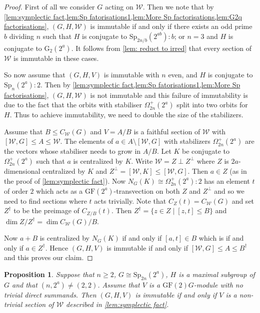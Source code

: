 \documentclass[12pt]{amsart}
\newtheorem{proposition}[theorem]{Proposition}
\theoremstyle{remark}
\theoremstyle{notation}
\theoremstyle{definition}
\newcommand{\GF}{\mathrm{GF}}
\newcommand{\Sp}{\mathrm{Sp}}
\newcommand{\0}{\emptyset}
\begin{document}
  \begin{proof}  First of all we consider $G$ acting on ${\mathcal W}$. Then we note that by \cref{lem:symplectic fact,lem:Sp fatorisations1,lem:More Sp factorisations,lem:G2q factorisations},  $(G,H,{\mathcal W})$ is immutable if and only if  there exists an odd prime $b$ dividing $n$ such that $H$ is conjugate to $\Sp_{2n/b}(2^{ab}){:}b$; or
  $n=3$ and $H$ is conjugate to  $\mathrm{G}_2(2^a)$. It follows from \cref{lem: reduct to irred}  that every section of ${\mathcal W}$ is immutable in these cases.




So now assume that $(G,H,V)$ is immutable with $n$ even, and $H$ is conjugate to $\Sp_{n}(2^a){:}2$. Then by \cref{lem:symplectic fact,lem:Sp fatorisations1,lem:More Sp factorisations}, $(G,H,{\mathcal W})$ is not immutable and this failure of immutability is due to the fact that the orbits with stabiliser $\Omega_{2n}^+(2^a)$ split into two orbits for $H$.  Thus to achieve immutability, we need to double the size of the stabilizers.

 Assume that $B \le C_{\mathcal W}(G)$ and $V=A/B$ is a faithful section of ${\mathcal W}$ with $[{\mathcal W},G]\le A \le {\mathcal W}$.  The elements of $a \in A\setminus [{\mathcal W},G]$ with stabilizers $\Omega_{2n}^+(2^a)$ are the vectors whose stabiliser needs to grow in $A/B$.  Let $K$ be conjugate to $\Omega_{2n}^+(2^a)$ such that $a$ is centralized by $K$. Write ${\mathcal W}=Z \perp Z^\perp$ where $Z$ is $2a$-dimensional  centralized by $K$ and $Z^\perp=[\mathcal W,K]\le [\mathcal W,G]$. Then $a\in Z$ (as in the proof of \cref{lem:symplectic fact}).  Now $N_G(K) \cong \Omega_{2n}^+(2^a){:}2$ has an element $t$ of order $2$ which acts as a $\GF(2^a)$-transvection on both $Z$ and $Z^\perp$ and so we need to find sections where $t$ acts trivially. Note that $C_Z(t)= C_{\mathcal W}(G)$ and set $Z^\dagger$ to be the preimage of $C_{Z /B}(t)$. Then $Z^\dagger=\{z\in Z \mid[z,t]\le B\}$ and  $\dim Z /Z^\dagger=\dim C_{\mathcal W}(G)/B$.

  Now $a+B$ is centralized by $N_G(K)$ if and only if $[a,t] \in B$ which is if and only if $a \in Z^\dagger$.  Hence $(G,H,V)$ is immutable if and only if $[\mathcal W,G]\le A \le B^\dagger$ and this proves our claim.
  \end{proof}



  \begin{proposition}\label{prop:symplecticGroups} Suppose that $n \ge 2$, $G \cong \Sp_{2n}(2^a)$, $H$ is a maximal subgroup of $G$ and that $(n,2^a) \ne (2,2)$. Assume that $V$ is a $\GF(2)G$-module with no trivial direct summands. Then $(G,H,V)$ is immutable if and only if $V$ is a non-trivial section of $\mathcal W$  described in \cref{lem:symplectic fact}.
  \end{proposition}
\end{document}
